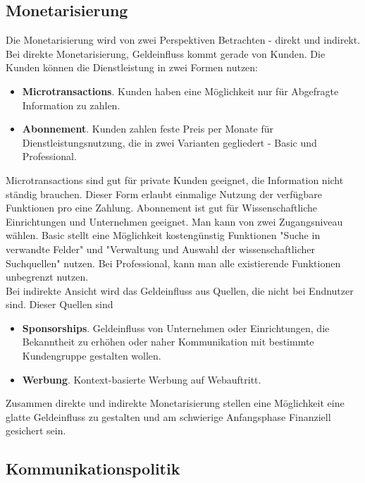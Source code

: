 \subsection{Monetarisierung}

Die Monetarisierung wird von zwei Perspektiven Betrachten - direkt und indirekt. Bei direkte Monetarisierung, Geldeinfluss kommt gerade von Kunden. Die Kunden können die Dienstleistung in zwei Formen nutzen:
\begin{itemize}
\item \textbf{Microtransactions}. Kunden haben eine Möglichkeit nur für Abgefragte Information zu zahlen. 

\item \textbf{Abonnement}. Kunden zahlen feste Preis per Monate für Dienstleistungsnutzung, die in zwei Varianten gegliedert - Basic und Professional.
\end{itemize}

Microtransactions sind gut für private Kunden geeignet, die Information nicht ständig brauchen. Dieser Form erlaubt einmalige Nutzung der verfügbare Funktionen pro eine Zahlung. Abonnement ist gut für Wissenschaftliche Einrichtungen und Unternehmen geeignet. Man kann von zwei Zugangsniveau wählen. Basic stellt eine Möglichkeit kostengünstig Funktionen "Suche in verwandte Felder" und "Verwaltung und Auswahl der wissenschaftlicher Suchquellen" nutzen. Bei Professional, kann man alle existierende Funktionen unbegrenzt nutzen.\\

Bei indirekte Ansicht wird das Geldeinfluss aus Quellen, die nicht bei Endnutzer sind. Dieser Quellen sind
\begin{itemize}
\item \textbf{Sponsorships}. Geldeinfluss von Unternehmen oder Einrichtungen, die Bekanntheit zu erhöhen oder naher Kommunikation mit bestimmte Kundengruppe gestalten wollen.
\item \textbf{Werbung}. Kontext-basierte Werbung auf Webauftritt.
\end{itemize}

Zusammen direkte und indirekte Monetarisierung stellen eine Möglichkeit eine glatte Geldeinfluss zu gestalten und am schwierige Anfangsphase Finanziell gesichert sein.

 
\subsection{Kommunikationspolitik}

